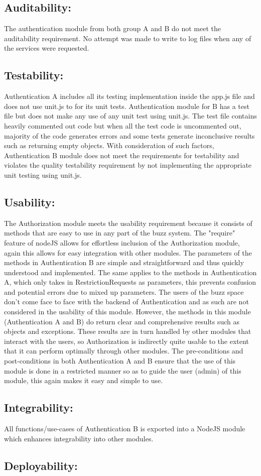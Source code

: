 \subsection{Auditability:}
The authentication module from both group A and B do not meet the auditability requirement. No attempt was made to write to log files when any of the services were requested.

\subsection{Testability:}
Authentication A includes all its testing implementation inside the app.js file and does not use unit.js to for its unit tests.  
Authentication module for B has a test file but does not make any use of any unit test using unit.js. The test file contains heavily commented out code but when all the test code is uncommented out, majority of the code generates errors and some tests generate inconclusive results such as returning empty objects. With consideration of such factors, Authentication B module does not meet the requirements for testability and violates the quality testability requirement by not implementing the appropriate unit testing using unit.js.

\subsection{Usability:}
The Authorization module meets the usability requirement because it consists
of methods that are easy to use in any part of the buzz system.
The "require" feature of nodeJS allows for effortless inclusion of the Authorization 
module, again this allows for easy integration with other modules.
The parameters of the methods in Authentication B are simple and straightforward and thus
quickly understood and implemented. The same applies to the methods in Authentication A, 
which only takes in RestrictionRequests as parameters, this prevents confusion and potential
errors due to mixed up parameters. 
The users of the buzz space don't come face to face with the backend of Authentication and as 
such are not considered in the usability of this module. However, the methods in this module
(Authentication A and B) do return clear and comprehensive results such as objects and exceptions. 
These results are in turn handled by other modules that interact with the users, so Authorization 
is indirectly quite usable to the extent that it can perform optimally through other modules.
The pre-conditions and post-conditions in both Authentication A and B ensure that the use of this 
module is done in a restricted manner so as to guide the user (admin) of this module, this again
makes it easy and simple to use.

\subsection{Integrability:}
All functions/use-cases of Authentication B is exported into a NodeJS module which enhances integrability into other modules.

\subsection{Deployability:}